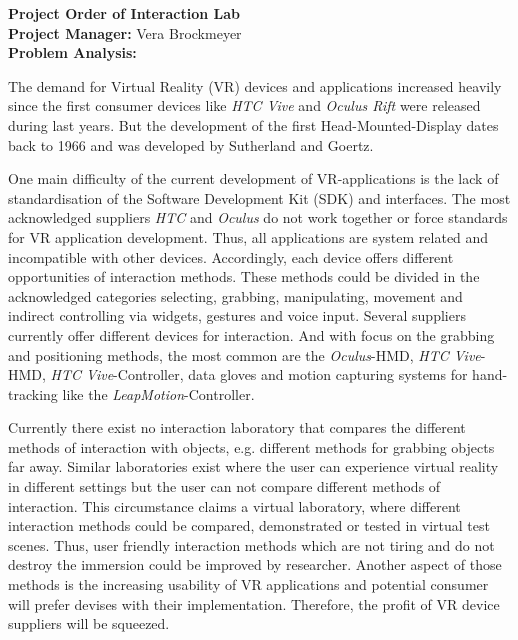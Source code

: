 \documentclass[a4paper, 12pt]{article}
\newcommand{\changefont}[3]{
\fontfamily{#1} \fontseries{#2} \fontshape{#3} \selectfont}
\begin{document}


\newpage


\textbf{\Large Project Order of Interaction Lab}\\


\textbf{Project Manager:} Vera Brockmeyer\\


\textbf{Problem Analysis:}

The demand for Virtual Reality (VR) devices and applications increased heavily since the first consumer devices like \textit{HTC Vive} and \textit{Oculus Rift} were released during last years. But the development of the first Head-Mounted-Display dates back to 1966 and was developed by Sutherland and Goertz. 

One main difficulty of the current development of VR-applications is the lack of standardisation of the Software Development Kit (SDK) and interfaces. The most acknowledged suppliers \textit{HTC} and \textit{Oculus} do not work together or force standards for VR application development. Thus, all applications are system related and incompatible with other devices. Accordingly, each device offers different opportunities of interaction methods. These methods could be divided in the acknowledged categories selecting, grabbing, manipulating, movement and indirect controlling via widgets, gestures and voice input. Several suppliers currently offer different devices for interaction. And with focus on the grabbing and positioning methods, the most common are the \textit{Oculus}-HMD, \textit{HTC Vive}-HMD, \textit{HTC Vive}-Controller, data gloves and motion capturing systems for hand-tracking like the \textit{LeapMotion}-Controller.

Currently there exist no interaction laboratory that compares the different methods of interaction with objects, e.g. different methods for grabbing objects far away. Similar laboratories \cite{lin2016towards}\cite{website:TU}\cite{website:steam} exist where the user can experience virtual reality in different settings but the user can not compare different methods of interaction. This circumstance claims a virtual laboratory, where different interaction methods could be compared, demonstrated or tested in virtual test scenes. Thus, user friendly interaction methods which are not tiring and do not destroy the immersion could be improved by researcher. Another aspect of those methods is the increasing usability of VR applications and potential consumer will prefer devises with their implementation. Therefore, the profit of VR device suppliers will be squeezed. \\
\end{document}
